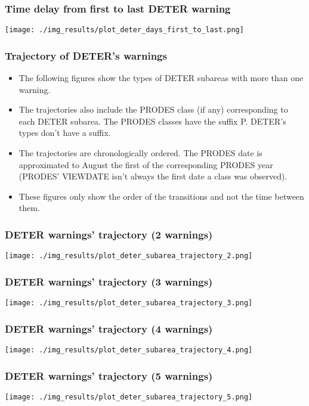 \documentclass{beamer}
\begin{document}
\begin{frame}
    \frametitle{Time delay from first to last DETER warning}
    \texttt{[image: ./img\_results/plot\_deter\_days\_first\_to\_last.png]}
\end{frame}


\begin{frame}
    \frametitle{Trajectory of DETER's warnings}
    \begin{itemize}
        \item The following figures show the types of DETER subareas with more
            than one warning. 
        \item The trajectories also include the PRODES class (if any) 
            corresponding to each DETER subarea. The PRODES classes have the 
            suffix P. DETER's types don't have a suffix.
        \item The trajectories are chronologically ordered. The PRODES date
            is approximated to August the first of the corresponding PRODES
            year (PRODES' VIEWDATE isn't always the first date a class was 
            observed).
        \item These figures only show the order of the transitions and not the
            time between them.
    \end{itemize}
\end{frame}

\begin{frame}
    \frametitle{DETER warnings' trajectory (2 warnings) }
    \texttt{[image: ./img\_results/plot\_deter\_subarea\_trajectory\_2.png]}
\end{frame}

\begin{frame}
    \frametitle{DETER warnings' trajectory (3 warnings) }
    \texttt{[image: ./img\_results/plot\_deter\_subarea\_trajectory\_3.png]}
\end{frame}

\begin{frame}
    \frametitle{DETER warnings' trajectory (4 warnings) }
    \texttt{[image: ./img\_results/plot\_deter\_subarea\_trajectory\_4.png]}
\end{frame}

\begin{frame}
    \frametitle{DETER warnings' trajectory (5 warnings) }
    \texttt{[image: ./img\_results/plot\_deter\_subarea\_trajectory\_5.png]}
\end{frame}
\end{document}
